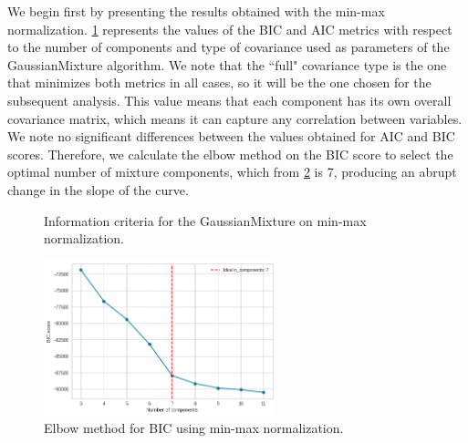 We begin first by presenting the results obtained with the min-max normalization. \cref{fig:plot-mixmax-bic} represents the values of the BIC and AIC metrics with respect to the number of components and type of covariance used as parameters of the GaussianMixture algorithm. We note that the ``full" covariance type is the one that minimizes both metrics in all cases, so it will be the one chosen for the subsequent analysis. This value means that each component has its own overall covariance matrix, which means it can capture any correlation between variables. We note no significant differences between the values obtained for AIC and BIC scores. Therefore, we calculate the elbow method on the BIC score to select the optimal number of mixture components, which from \cref{fig:plot-mixmax-elbow} is 7, producing an abrupt change in the slope of the curve.

\begin{figure}
    \centering
    \caption{Information criteria for the GaussianMixture on min-max normalization.}
    \label{fig:plot-mixmax-bic}
\end{figure}

\begin{figure}
    \centering
    \includegraphics[width=0.6\textwidth]{Images/bic_minmax_elbow_2.png}
    \caption{Elbow method for BIC using min-max normalization.}
    \label{fig:plot-mixmax-elbow}
\end{figure}

